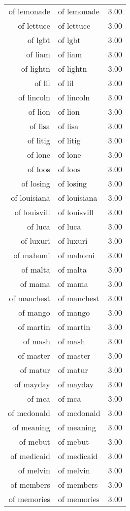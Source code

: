 \begin{table}[ht]
\begin{tabular}{rlr}
  of lemonade & of lemonade & 3.00 \\ 
  of lettuce & of lettuce & 3.00 \\ 
  of lgbt & of lgbt & 3.00 \\ 
  of liam & of liam & 3.00 \\ 
  of lightn & of lightn & 3.00 \\ 
  of lil & of lil & 3.00 \\ 
  of lincoln & of lincoln & 3.00 \\ 
  of lion & of lion & 3.00 \\ 
  of lisa & of lisa & 3.00 \\ 
  of litig & of litig & 3.00 \\ 
  of lone & of lone & 3.00 \\ 
  of loos & of loos & 3.00 \\ 
  of losing & of losing & 3.00 \\ 
  of louisiana & of louisiana & 3.00 \\ 
  of louisvill & of louisvill & 3.00 \\ 
  of luca & of luca & 3.00 \\ 
  of luxuri & of luxuri & 3.00 \\ 
  of mahomi & of mahomi & 3.00 \\ 
  of malta & of malta & 3.00 \\ 
  of mama & of mama & 3.00 \\ 
  of manchest & of manchest & 3.00 \\ 
  of mango & of mango & 3.00 \\ 
  of martin & of martin & 3.00 \\ 
  of mash & of mash & 3.00 \\ 
  of master & of master & 3.00 \\ 
  of matur & of matur & 3.00 \\ 
  of mayday & of mayday & 3.00 \\ 
  of mca & of mca & 3.00 \\ 
  of mcdonald & of mcdonald & 3.00 \\ 
  of meaning & of meaning & 3.00 \\ 
  of mebut & of mebut & 3.00 \\ 
  of medicaid & of medicaid & 3.00 \\ 
  of melvin & of melvin & 3.00 \\ 
  of members & of members & 3.00 \\ 
  of memories & of memories & 3.00 \\ 

\end{tabular}
\end{table}
